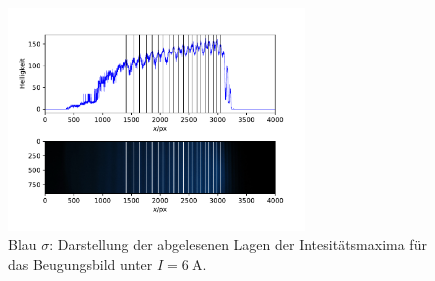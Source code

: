 \begin{figure}
  \centering
  \includegraphics[width = 0.7\textwidth]{../Messdaten/plots/peaks_blau_sigma_6.pdf}
  \caption{Blau $\sigma$: Darstellung der abgelesenen Lagen der Intesitätsmaxima für das Beugungsbild unter $I =\SI{6}{\ampere}$.}
  \label{fig: peaks_blau_sigma_6}
\end{figure}

